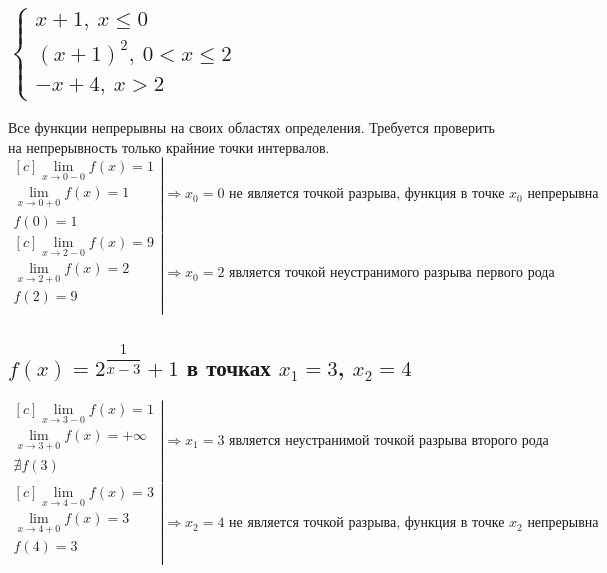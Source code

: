 \documentclass[12pt]{article}
\begin{document}
\begin{sloppypar}
    \subsection{$\left\{\begin{array}{l}
                x + 1,\ x \leq 0         \\
                (x + 1)^2,\ 0 < x \leq 2 \\
                -x + 4,\ x > 2
            \end{array}\right.
        $}
    Все функции непрерывны на своих областях определения. Требуется проверить на непрерывность только крайние точки интервалов.
    \[
        \left.\begin{aligned}[c]
            \lim_{x \rightarrow 0 - 0} f(x) = 1 \\
            \lim_{x \rightarrow 0 + 0} f(x) = 1 \\
            f(0) = 1
        \end{aligned}\right|
        \Rightarrow x_0 = 0 \text{ не является точкой разрыва, функция в точке $x_0$ непрерывна}
    \]
    \[
        \left.\begin{aligned}[c]
            \lim_{x \rightarrow 2 - 0} f(x) = 9 \\
            \lim_{x \rightarrow 2 + 0} f(x) = 2 \\
            f(2) = 9                            \\
        \end{aligned}\right|
        \Rightarrow x_0 = 2 \text{ является точкой неустранимого разрыва первого рода}
    \]

    \subsection{$f(x) = 2^{\dfrac{1}{x - 3}} + 1$ в точках $x_1 = 3$, $x_2 = 4$}
    \[
        \left.\begin{aligned}[c]
            \lim_{x \rightarrow 3 - 0} f(x) = 1       \\
            \lim_{x \rightarrow 3 + 0} f(x) = +\infty \\
            \nexists f(3)                             \\
        \end{aligned}\right|
        \Rightarrow x_1 = 3 \text{ является неустранимой точкой разрыва второго рода}
    \]
    \[
        \left.\begin{aligned}[c]
            \lim_{x \rightarrow 4 - 0} f(x) = 3 \\
            \lim_{x \rightarrow 4 + 0} f(x) = 3 \\
            f(4) = 3                            \\
        \end{aligned}\right|
        \Rightarrow
        x_2 = 4 \text{ не является точкой разрыва, функция в точке $x_2$ непрерывна}
    \]


\end{sloppypar}
\end{document}
